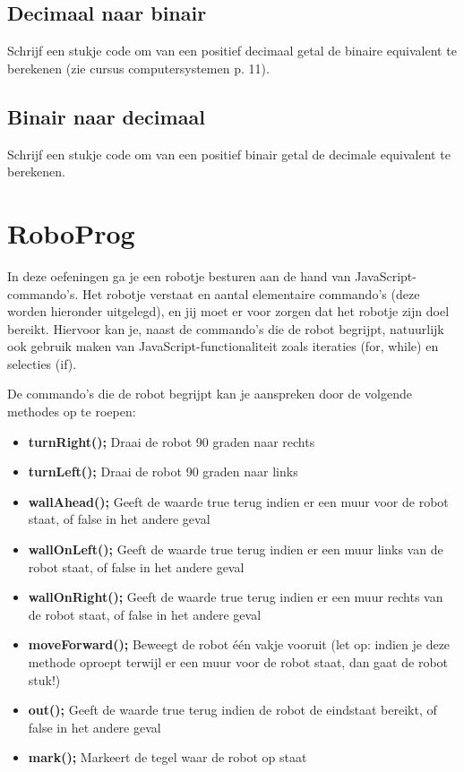 \subsection{Decimaal naar binair}

Schrijf een stukje code om van een positief decimaal getal de binaire equivalent te berekenen (zie cursus computersystemen p. 11).

\subsection{Binair naar decimaal}

Schrijf een stukje code om van een positief binair getal de decimale equivalent te berekenen.

\section{RoboProg}

In deze oefeningen ga je een robotje besturen aan de hand van JavaScript-commando's. Het robotje verstaat en aantal elementaire commando's (deze worden hieronder uitgelegd), en jij moet er voor zorgen dat het robotje zijn doel bereikt. Hiervoor kan je, naast de commando's die de robot begrijpt, natuurlijk ook gebruik maken van JavaScript-functionaliteit zoals iteraties (for, while) en selecties (if).

De commando's die de robot begrijpt kan je aanspreken door de volgende methodes op te roepen:

\begin{itemize}
\item \textbf{turnRight();}	Draai de robot 90 graden naar rechts
\item \textbf{turnLeft();}	Draai de robot 90 graden naar links
\item \textbf{wallAhead();}	Geeft de waarde true terug indien er een muur voor de robot staat, of false in het andere geval
\item \textbf{wallOnLeft();}	Geeft de waarde true terug indien er een muur links van de robot staat, of false in het andere geval
\item \textbf{wallOnRight();}	Geeft de waarde true terug indien er een muur rechts van de robot staat, of false in het andere geval
\item \textbf{moveForward();} Beweegt de robot \'e\'en vakje vooruit (let op: indien je deze methode oproept terwijl er een muur voor de robot staat, dan gaat de robot stuk!)
\item \textbf{out();}		Geeft de waarde true terug indien de robot de eindstaat bereikt, of false in het andere geval
\item \textbf{mark();}		Markeert de tegel waar de robot op staat
\end{itemize}

